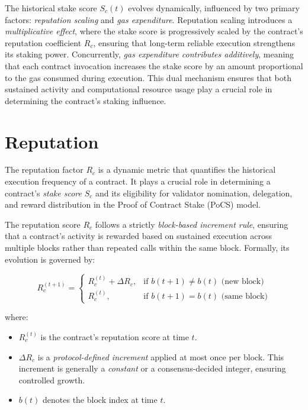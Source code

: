 \documentclass{article}
\begin{document}
The historical stake score \( S_c(t) \) evolves dynamically, influenced by two primary factors: \textit{reputation scaling} and \textit{gas expenditure}. Reputation scaling introduces a \textit{multiplicative effect}, where the stake score is progressively scaled by the contract's reputation coefficient \( R_c \), ensuring that long-term reliable execution strengthens its staking power. Concurrently, \textit{gas expenditure contributes additively}, meaning that each contract invocation increases the stake score by an amount proportional to the gas consumed during execution. This dual mechanism ensures that both sustained activity and computational resource usage play a crucial role in determining the contract’s staking influence.

\section{Reputation}

The reputation factor \( R_c \) is a dynamic metric that quantifies the historical execution frequency of a contract. It plays a crucial role in determining a contract’s \textit{stake score} \( S_c \) and its eligibility for validator nomination, delegation, and reward distribution in the Proof of Contract Stake (PoCS) model.

The reputation score \( R_c \) follows a strictly \textit{block-based increment rule}, ensuring that a contract's activity is rewarded based on sustained execution across multiple blocks rather than repeated calls within the same block. Formally, its evolution is governed by:

\begin{equation}
    R_c^{(t+1)} =
    \begin{cases} 
    R_c^{(t)} + \Delta R_c, & \text{if } b(t+1) \neq b(t) \text{ (new block)} \\
    R_c^{(t)}, & \text{if } b(t+1) = b(t) \text{ (same block)}
    \end{cases}
\end{equation}

where:
\begin{itemize}
    \item \( R_c^{(t)} \) is the contract’s reputation score at time \( t \).
    \item \( \Delta R_c \) is a \textit{protocol-defined increment} applied at most once per block. This increment is generally a \textit{constant} or a consensus-decided integer, ensuring controlled growth.
    \item \( b(t) \) denotes the block index at time \( t \).
\end{itemize}
\end{document}

